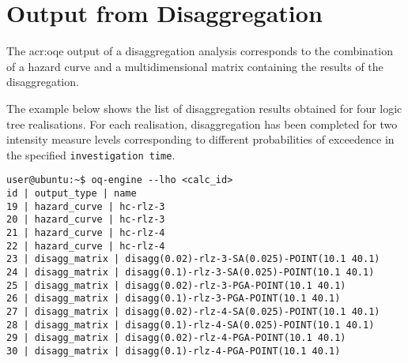 \section{Output from Disaggregation}
The \gls{acr:oqe} output of a disaggregation analysis  
corresponds to the combination of a hazard curve and a multidimensional 
matrix containing the results of the disaggregation.

The example below shows the list of disaggregation results obtained 
for four logic tree realisations. 
%
For each realisation, disaggregation has been completed for two  
intensity measure levels corresponding to different probabilities of 
exceedence in the specified \texttt{investigation time}.
\begin{Verbatim}[frame=single, commandchars=\\\{\}]
user@ubuntu:~$ oq-engine --lho <calc_id> 
id | output_type | name
19 | hazard_curve | hc-rlz-3
20 | hazard_curve | hc-rlz-3
21 | hazard_curve | hc-rlz-4
22 | hazard_curve | hc-rlz-4
23 | disagg_matrix | disagg(0.02)-rlz-3-SA(0.025)-POINT(10.1 40.1)
24 | disagg_matrix | disagg(0.1)-rlz-3-SA(0.025)-POINT(10.1 40.1)
25 | disagg_matrix | disagg(0.02)-rlz-3-PGA-POINT(10.1 40.1)
26 | disagg_matrix | disagg(0.1)-rlz-3-PGA-POINT(10.1 40.1)
27 | disagg_matrix | disagg(0.02)-rlz-4-SA(0.025)-POINT(10.1 40.1)
28 | disagg_matrix | disagg(0.1)-rlz-4-SA(0.025)-POINT(10.1 40.1)
29 | disagg_matrix | disagg(0.02)-rlz-4-PGA-POINT(10.1 40.1)
30 | disagg_matrix | disagg(0.1)-rlz-4-PGA-POINT(10.1 40.1)
\end{Verbatim}

